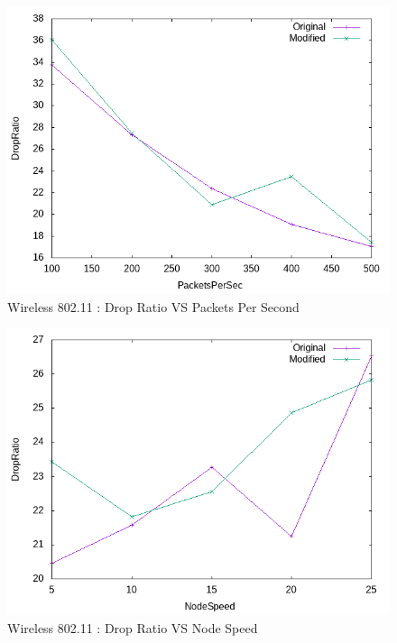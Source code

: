     \begin{figure}[!h] 
        \centering
        \includegraphics[width=.9\textwidth]{Pictures/Wireless802.11Mobile/Combined/DropRatioVSPacketsPerSec.png}
         \caption{Wireless 802.11 : Drop Ratio VS Packets Per Second}
    \end{figure}
    
    \begin{figure}[!h] 
        \centering
        \includegraphics[width=.9\textwidth]{Pictures/Wireless802.11Mobile/Combined/DropRatioVSNodeSpeed.png}
         \caption{Wireless 802.11 : Drop Ratio VS Node Speed}
    \end{figure}


\newpage
